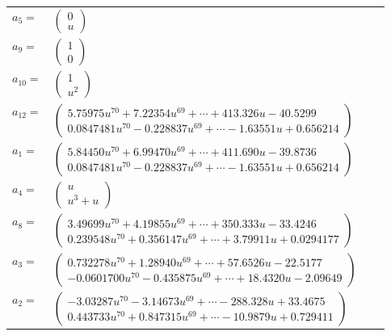 \documentclass[1p]{elsarticle_modified}
\theoremstyle{definition}
\begin{document}
\begin{tabular}{m{7pt} m{180pt} m{7pt} m{180pt} }
\flushright $a_{5}=$&$\begin{pmatrix}0\\u\end{pmatrix}$ \\
\flushright $a_{9}=$&$\begin{pmatrix}1\\0\end{pmatrix}$ \\
\flushright $a_{10}=$&$\begin{pmatrix}1\\u^2\end{pmatrix}$ \\
\flushright $a_{12}=$&$\begin{pmatrix}5.75975 u^{70}+7.22354 u^{69}+\cdots+413.326 u-40.5299\\0.0847481 u^{70}-0.228837 u^{69}+\cdots-1.63551 u+0.656214\end{pmatrix}$ \\
\flushright $a_{1}=$&$\begin{pmatrix}5.84450 u^{70}+6.99470 u^{69}+\cdots+411.690 u-39.8736\\0.0847481 u^{70}-0.228837 u^{69}+\cdots-1.63551 u+0.656214\end{pmatrix}$ \\
\flushright $a_{4}=$&$\begin{pmatrix}u\\u^3+u\end{pmatrix}$ \\
\flushright $a_{8}=$&$\begin{pmatrix}3.49699 u^{70}+4.19855 u^{69}+\cdots+350.333 u-33.4246\\0.239548 u^{70}+0.356147 u^{69}+\cdots+3.79911 u+0.0294177\end{pmatrix}$ \\
\flushright $a_{3}=$&$\begin{pmatrix}0.732278 u^{70}+1.28940 u^{69}+\cdots+57.6526 u-22.5177\\-0.0601700 u^{70}-0.435875 u^{69}+\cdots+18.4320 u-2.09649\end{pmatrix}$ \\
\flushright $a_{2}=$&$\begin{pmatrix}-3.03287 u^{70}-3.14673 u^{69}+\cdots-288.328 u+33.4675\\0.443733 u^{70}+0.847315 u^{69}+\cdots-10.9879 u+0.729411\end{pmatrix}$ \\

\end{tabular}
\end{document}
